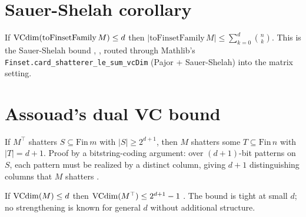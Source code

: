 \section{Sauer-Shelah corollary}\label{sec:sauer-shelah}

\begin{thm}
\label{thm:card-toFinsetFamily-le}
  \leanok
If $\mathrm{VCdim}(\mathrm{toFinsetFamily}\,M) \le d$ then
$|\mathrm{toFinsetFamily}\,M| \le \sum_{k = 0}^{d} \binom{n}{k}$.
This is the Sauer-Shelah bound \cite{sauer1972}, \cite{shelah1972},
\cite{vapnik1971} routed through Mathlib's
\texttt{Finset.card\_shatterer\_le\_sum\_vcDim}
(Pajor + Sauer-Shelah) into the matrix setting.
\end{thm}

\section{Assouad's dual VC bound}\label{sec:assouad-dual-vc}

\begin{lemma}
\label{lem:transpose-shatters-imp-shatters}
  \leanok
If $M^\top$ shatters $S \subseteq \mathrm{Fin}\,m$ with $|S| \ge 2^{d+1}$,
then $M$ shatters some $T \subseteq \mathrm{Fin}\,n$ with $|T| = d + 1$.
Proof by a bitstring-coding argument: over $(d+1)$-bit patterns on $S$,
each pattern must be realized by a distinct column, giving $d + 1$
distinguishing columns that $M$ shatters
\cite[Thm~2.13]{assouad1983}.
\end{lemma}

\begin{thm}
\label{thm:assouad}
  \leanok
If $\mathrm{VCdim}(M) \le d$ then $\mathrm{VCdim}(M^\top) \le 2^{d+1} - 1$
\cite[Thm~2.13]{assouad1983}. The bound is tight at small $d$; no
strengthening is known for general $d$ without additional structure.
\end{thm}
